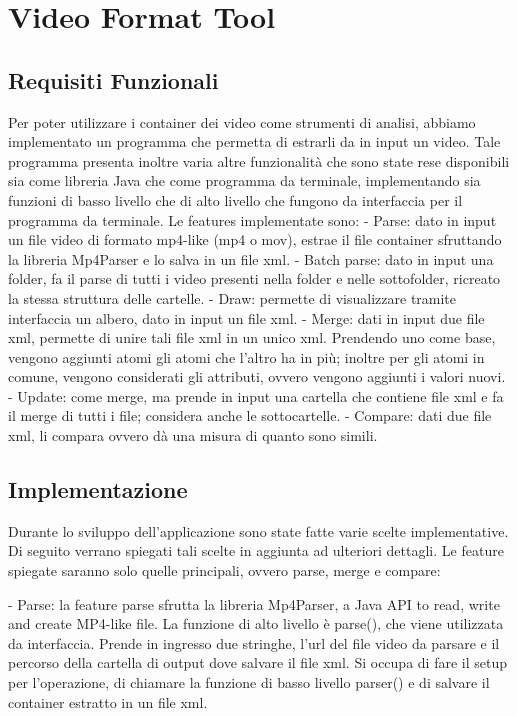 \section{Video Format Tool}

\subsection{Requisiti Funzionali}
 
Per poter utilizzare i container dei video come strumenti di analisi, abbiamo implementato un programma che permetta di estrarli da in input un video.
Tale programma presenta inoltre varia altre funzionalità che sono state rese disponibili sia come libreria Java che come programma da terminale, implementando sia funzioni di basso livello che di alto livello che fungono da interfaccia per il programma da terminale.
Le features implementate sono:
- Parse: dato in input un file video di formato mp4-like (mp4 o mov), estrae il file container sfruttando la libreria Mp4Parser e lo salva in un file xml.
- Batch parse: dato in input una folder, fa il parse di tutti i video presenti nella folder e nelle sottofolder, ricreato la stessa struttura delle cartelle.
- Draw: permette di visualizzare tramite interfaccia un albero, dato in input un file xml.
- Merge: dati in input due file xml, permette di unire tali file xml in un unico xml. Prendendo uno come base, vengono aggiunti atomi gli atomi che l'altro ha in più; inoltre per gli atomi in comune, vengono considerati gli attributi, ovvero vengono aggiunti i valori nuovi.
- Update: come merge, ma prende in input una cartella che contiene file xml e fa il merge di tutti i file; considera anche le sottocartelle.
- Compare: dati due file xml, li compara ovvero dà una misura di quanto sono simili.


\subsection{Implementazione}

Durante lo sviluppo dell'applicazione sono state fatte varie scelte implementative. Di seguito verrano spiegati tali scelte in aggiunta ad ulteriori dettagli. Le feature spiegate saranno solo quelle principali, ovvero parse, merge e compare:

- Parse:
 la feature parse sfrutta la libreria Mp4Parser, a Java API to read, write and create MP4-like file.
 La funzione di alto livello è parse(), che viene utilizzata da interfaccia. Prende in ingresso due stringhe, l'url del file video da parsare e il percorso della cartella di output dove salvare il file xml. Si occupa di fare il setup per l'operazione, di chiamare la funzione di basso livello parser() e di salvare il container estratto in un file xml.

